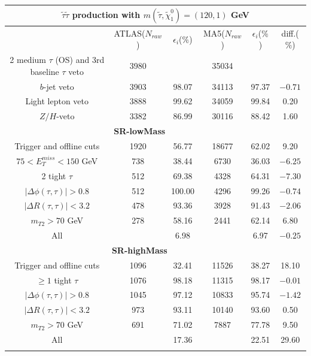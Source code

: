 \documentclass{ws-mpla}
\begin{document}
\begin{table}[h!]
  {\begin{tabular}{@{}c c c c c c@{}} \toprule
\hline
\multicolumn{6}{c}{ \textbf{$ \tilde{\tau}\tilde{\tau} $ production with $ m(\tilde{\tau},\tilde{\chi}^0_1) = (120,1) $ GeV} }\\
\hline\hline
 & ATLAS($N_{raw}$) & $\epsilon_i$($\%$) & MA5($N_{raw}$) & $\epsilon_i$($\%$) & diff.($\%$) \\
\hline\hline

2 medium $\tau$ (OS) and 3rd baseline $\tau$ veto & 3980 & & 35034 & & \\ \hline
$b$-jet veto & 3903 & 98.07 & 34113 & 97.37 & $-0.71$ \\ \hline
Light lepton veto & 3888 & 99.62 & 34059 & 99.84 & 0.20 \\ \hline
$Z/H$-veto & 3382 & 86.99 & 30116 & 88.42 & 1.60 \\ \hline
%
\multicolumn{5}{c}{ \textbf{SR-lowMass} }\\\hline
%
Trigger and offline cuts & 1920 & 56.77 & 18677 & 62.02 & 9.20 \\ \hline
$ 75 < E^{miss}_T < 150 $ GeV & 738 & 38.44 & 6730 & 36.03 & $-6.25$ \\ \hline
2 tight $\tau$ & 512 & 69.38 & 4328 & 64.31 & $-7.30$ \\ \hline
$ |\Delta\phi(\tau,\tau)| > 0.8 $ & 512 & 100.00 & 4296 & 99.26 & $-0.74$ \\ \hline
$ |\Delta R(\tau,\tau)| < 3.2 $ & 478 & 93.36 & 3928 & 91.43 & $-2.06$ \\ \hline
$ m_{T2} > 70 $ GeV & 278 & 58.16 & 2441 & 62.14 & 6.80 \\ \hline
All &  & 6.98 &  & 6.97 & $-0.25$ \\ \hline
%
\hline
\multicolumn{5}{c}{ \textbf{SR-highMass} }\\\hline
%
Trigger and offline cuts & 1096 & 32.41 & 11526 & 38.27 & 18.10 \\ \hline
$ \geq 1 $ tight $\tau$ & 1076 & 98.18 & 11315 & 98.17 & $-0.01$ \\ \hline
$ |\Delta\phi(\tau,\tau)| > 0.8 $ & 1045 & 97.12 & 10833 & 95.74 & $-1.42$ \\ \hline
$ |\Delta R(\tau,\tau)| < 3.2 $ & 973 & 93.11 & 10140 & 93.60 & 0.50 \\ \hline
$ m_{T2} > 70 $ GeV & 691 & 71.02 & 7887 & 77.78 & 9.50 \\ \hline
All &  & 17.36 &  & 22.51 & 29.60 \\ \botrule
\end{tabular}
\label{tab:280GeV} }
\end{table} 
\end{document}
